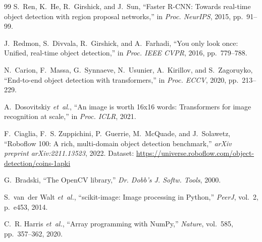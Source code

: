 \documentclass[conference,a4paper]{IEEEtran}
\begin{document}
\begin{thebibliography}{99}
S.~Ren, K.~He, R.~Girshick, and J.~Sun, ``Faster R-CNN: Towards real-time object detection with region proposal networks,'' in \emph{Proc. NeurIPS}, 2015, pp.~91--99.

J.~Redmon, S.~Divvala, R.~Girshick, and A.~Farhadi, ``You only look once: Unified, real-time object detection,'' in \emph{Proc. IEEE CVPR}, 2016, pp.~779--788.

N.~Carion, F.~Massa, G.~Synnaeve, N.~Usunier, A.~Kirillov, and S.~Zagoruyko, ``End-to-end object detection with transformers,'' in \emph{Proc. ECCV}, 2020, pp.~213--229.

A.~Dosovitskiy \emph{et~al.}, ``An image is worth 16x16 words: Transformers for image recognition at scale,'' in \emph{Proc. ICLR}, 2021.

F.~Ciaglia, F.~S. Zuppichini, P.~Guerrie, M.~McQuade, and J.~Solawetz, ``Roboflow 100: A rich, multi-domain object detection benchmark,'' \emph{arXiv preprint arXiv:2211.13523}, 2022. Dataset: \url{https://universe.roboflow.com/object-detection/coins-1apki}

G.~Bradski, ``The OpenCV library,'' \emph{Dr. Dobb's J. Softw. Tools}, 2000.

S.~van~der Walt \emph{et~al.}, ``scikit-image: Image processing in Python,'' \emph{PeerJ}, vol.~2, p.~e453, 2014.

C.~R. Harris \emph{et~al.}, ``Array programming with NumPy,'' \emph{Nature}, vol.~585, pp.~357--362, 2020.
\end{thebibliography}
\end{document}
